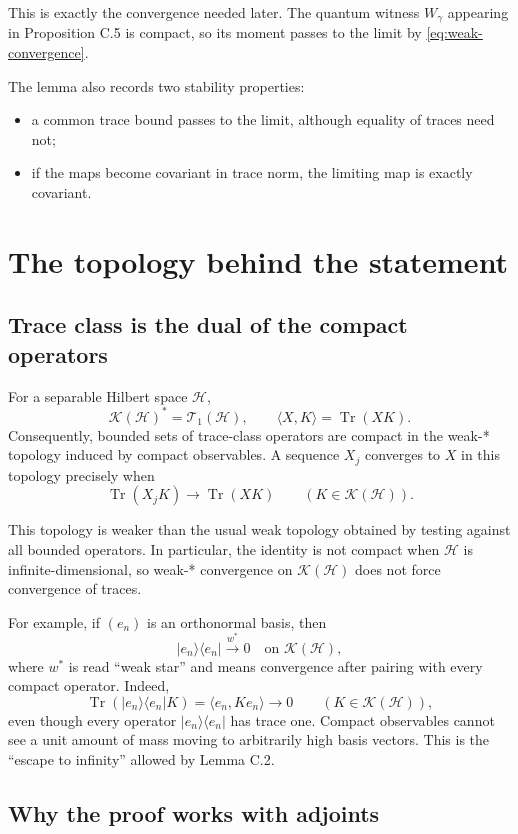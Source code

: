 \documentclass[11pt]{article}
\newcommand{\Hc}{\mathcal H}
\newcommand{\T}{\mathcal T_1}
\newcommand{\K}{\mathcal K}
\newcommand{\Tr}{\operatorname{Tr}}
\begin{document}
This is exactly the convergence needed later.  The quantum witness
$W_\gamma$ appearing in Proposition C.5 is compact, so its moment
passes to the limit by \eqref{eq:weak-convergence}.

The lemma also records two stability properties:
\begin{itemize}
  \item a common trace bound passes to the limit, although equality of traces
  need not;
  \item if the maps become covariant in trace norm, the limiting map is
  exactly covariant.
\end{itemize}

\section{The topology behind the statement}

\subsection{Trace class is the dual of the compact operators}

For a separable Hilbert space $\Hc$,
\[
  \K(\Hc)^*=\T(\Hc),
  \qquad
  \langle X,K\rangle=\Tr(XK).
\]
Consequently, bounded sets of trace-class operators are compact in the
weak-* topology induced by compact observables.  A sequence $X_j$ converges
to $X$ in this topology precisely when
\[
  \Tr(X_jK)\longrightarrow\Tr(XK)
  \qquad(K\in\K(\Hc)).
\]

This topology is weaker than the usual weak topology obtained by testing
against all bounded operators.  In particular, the identity is not compact
when $\Hc$ is infinite-dimensional, so weak-* convergence on $\K(\Hc)$ does
not force convergence of traces.

For example, if $(e_n)$ is an orthonormal basis, then
\[
  |e_n\rangle\!\langle e_n|\stackrel{w^*}{\longrightarrow}0
  \quad\text{on }\K(\Hc),
\]
where $w^*$ is read ``weak star'' and means convergence after pairing with
every compact operator.  Indeed,
\[
  \Tr\!\left(|e_n\rangle\!\langle e_n|K\right)
  =\langle e_n,Ke_n\rangle\longrightarrow0
  \qquad(K\in\K(\Hc)),
\]
even though every operator $|e_n\rangle\!\langle e_n|$ has trace one.
Compact observables cannot see a unit amount of mass moving to arbitrarily
high basis vectors.  This is the ``escape to infinity'' allowed by Lemma C.2.

\subsection{Why the proof works with adjoints}
\end{document}
